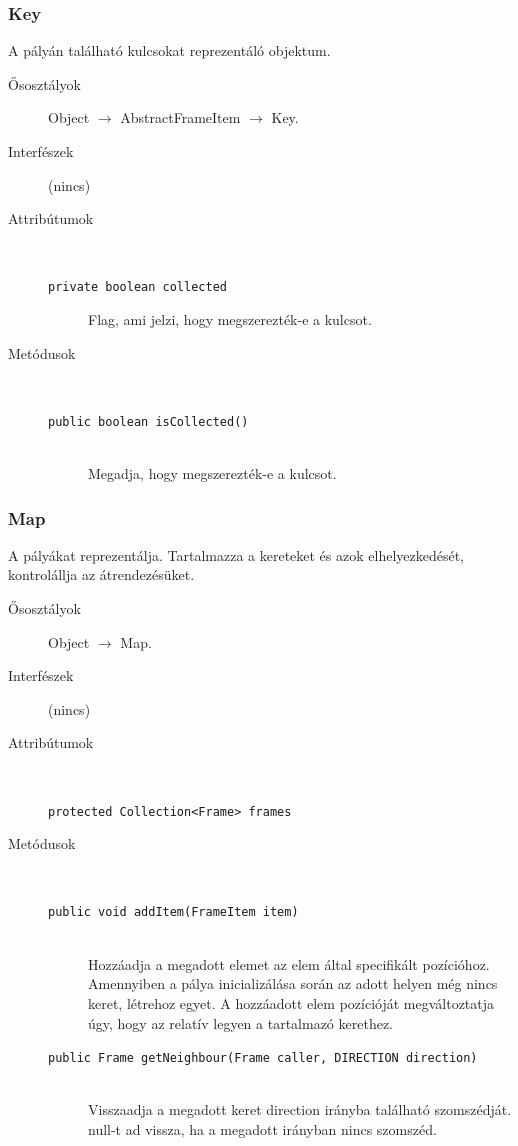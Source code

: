 		\subsubsection{Key}
				 A pályán található kulcsokat reprezentáló objektum. 			\begin{description}


				\item[Ősosztályok] Object $\rightarrow{}$ AbstractFrameItem $\rightarrow{}$ Key.
				\item[Interfészek] (nincs)
				\item[Attribútumok]$\ $
					\begin{description}
						\item[\texttt{private boolean collected}] Flag, ami jelzi, hogy megszerezték-e a kulcsot. 
					\end{description}
				\item[Metódusok]$\ $
					\begin{description}
						\item[\texttt{public boolean isCollected()}] \hfill \\ Megadja, hogy megszerezték-e a kulcsot. 
					\end{description}
			\end{description}

		\subsubsection{Map}
				 A pályákat reprezentálja. Tartalmazza a kereteket és azok elhelyezkedését,  kontrolállja az átrendezésüket. 			\begin{description}


				\item[Ősosztályok] Object $\rightarrow{}$ Map.
				\item[Interfészek] (nincs)
				\item[Attribútumok]$\ $
					\begin{description}
						\item[\texttt{protected Collection<Frame> frames}]%
					\end{description}
				\item[Metódusok]$\ $
					\begin{description}
						\item[\texttt{public void addItem(FrameItem item)}] \hfill \\ Hozzáadja a megadott elemet az elem által specifikált pozícióhoz.  Amennyiben a pálya inicializálása során az adott helyen még nincs keret,  létrehoz egyet.   A hozzáadott elem pozícióját megváltoztatja úgy, hogy az relatív  legyen a tartalmazó kerethez. 
						\item[\texttt{public Frame getNeighbour(Frame caller, DIRECTION direction)}] \hfill \\ Visszaadja a megadott keret direction irányba található  szomszédját. null-t ad vissza, ha a megadott irányban  nincs szomszéd. 
					\end{description}
			\end{description}

